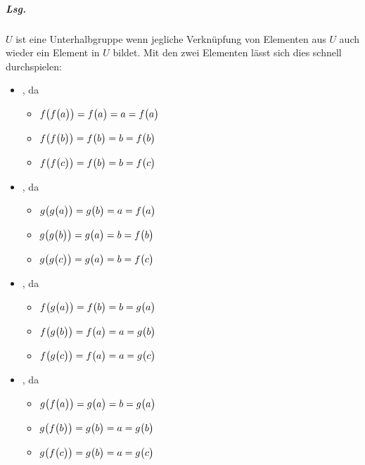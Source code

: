 \documentclass{scrreprt}
\begin{document}
\begin{enumerate}[(a)]
  \subparagraph{Lsg.} $U$ ist eine Unterhalbgruppe wenn jegliche Verknüpfung von
  Elementen aus $U$ auch wieder ein Element in $U$ bildet.
  Mit den zwei Elementen lässt sich dies schnell durchspielen:
  \begin{itemize}
  \item[$f \circ f = f$], da
    \begin{itemize}
    \item $f\qty(f\qty\big(a)) = f\qty\big(a) = a = f\qty\big(a)$
    \item $f\qty(f\qty\big(b)) = f\qty\big(b) = b = f\qty\big(b)$
    \item $f\qty(f\qty\big(c)) = f\qty\big(b) = b = f\qty\big(c)$
    \end{itemize}
  \item[$g \circ g = f$], da
    \begin{itemize}
    \item $g\qty(g\qty\big(a)) = g\qty\big(b) = a = f\qty\big(a)$
    \item $g\qty(g\qty\big(b)) = g\qty\big(a) = b = f\qty\big(b)$
    \item $g\qty(g\qty\big(c)) = g\qty\big(a) = b = f\qty\big(c)$
    \end{itemize}
  \item[$f \circ g = g$], da
    \begin{itemize}
    \item $f\qty(g\qty\big(a)) = f\qty\big(b) = b = g\qty\big(a)$
    \item $f\qty(g\qty\big(b)) = f\qty\big(a) = a = g\qty\big(b)$
    \item $f\qty(g\qty\big(c)) = f\qty\big(a) = a = g\qty\big(c)$
    \end{itemize}
  \item[$g \circ f = g$], da
    \begin{itemize}
    \item $g\qty(f\qty\big(a)) = g\qty\big(a) = b = g\qty\big(a)$
    \item $g\qty(f\qty\big(b)) = g\qty\big(b) = a = g\qty\big(b)$
    \item $g\qty(f\qty\big(c)) = g\qty\big(b) = a = g\qty\big(c)$
    \end{itemize}
  \end{itemize}
\end{enumerate}

\newpage
\end{document}
